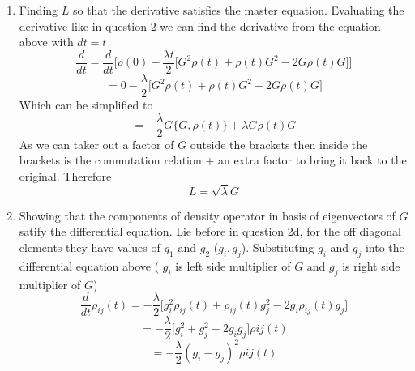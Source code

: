 \documentclass[12pt]{article}
\begin{document}
\begin{enumerate}
    \item Finding $L$ so that the derivative satisfies the master equation. Evaluating the derivative like in question 2 we can find the derivative from the equation above with $dt =t$
    $$ \frac{d}{dt} = \frac{d}{dt} \Big[\rho (0) - \frac{\lambda t}{2} \Big[ G^2 \rho (t) + \rho (t) G^2 - 2G\rho (t) G \Big] \Big] $$
    $$ = 0 - \frac{\lambda}{2} \Big[ G^2 \rho (t) + \rho (t) G^2 - 2G \rho (t) G \Big] $$
    Which can be simplified to 
    $$ = -\frac{\lambda}{2} G \{G, \rho (t) \} + \lambda G \rho (t) G $$
    As we can taker out a factor of $G$ outside the brackets then inside the brackets is the commutation relation + an extra factor to bring it back to the original. Therefore 
    $$ L = \sqrt{\lambda} G $$

    \item Showing that the components of density operator in basis of eigenvectors of $G$ satify the differential equation. Lie before in question 2d, for the off diagonal elements they have values of $g_1$ and $g_2$ ($g_i, g_j$). Substituting $g_i$ and $g_j$ into the differential equation above ( $g_i$ is left side multiplier of $G$ and $g_j$ is right side multiplier of $G$)
    $$ \frac{d}{dt} \rho_{ij} (t) = - \frac{\lambda}{2} \Big[ g_i^2 \rho_{ij} (t) + \rho_{ij} (t) g_j^2 - 2g_i \rho_{ij} (t) g_j  \Big] $$
    $$ = - \frac{\lambda}{2} \Big[ g_i^2 + g_j^2 - 2g_i g_j \Big] \rho{ij} (t) $$
    $$ = - \frac{\lambda}{2} (g_i - g_j)^2 \rho{ij} (t) $$


\end{enumerate}
\end{document}
